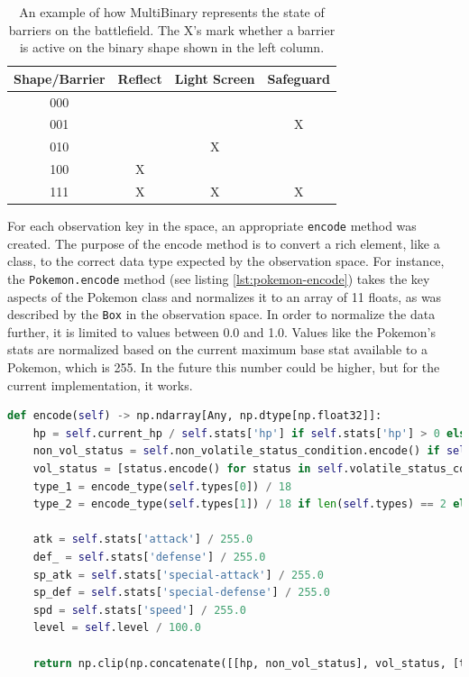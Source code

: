 \begin{table}[h]
    \centering
    \begin{tabular}{|c|c|c|c|}
        \hline
        Shape/Barrier & Reflect & Light Screen & Safeguard \\\hline
        000           &         &              &           \\\hline
        001           &         &              & X         \\\hline
        010           &         & X            &           \\\hline
        100           & X       &              &           \\\hline
        111           & X       & X            & X         \\\hline
    \end{tabular}
    \label{tab:multibinary-barrier-example}
    \caption{An example of how MultiBinary represents the state of barriers on the battlefield. The X's mark whether a
        barrier is active on the binary shape shown in the left column.}
\end{table}

For each observation key in the space, an appropriate \lstinline|encode| method was created. The purpose of the encode method
is to convert a rich element, like a class, to the correct data type expected by the observation space. For instance, the
\lstinline|Pokemon.encode| method (see listing \ref{lst:pokemon-encode}) takes the key aspects of the Pokemon class and normalizes it to an array of 11 floats,
as was described by the \lstinline|Box| in the observation space. In order to normalize the data further, it is limited to
values between 0.0 and 1.0. Values like the Pokemon's stats are normalized based on the current maximum base stat available to 
a Pokemon, which is 255. In the future this number could be higher, but for the current implementation, it works.  

\begin{lstlisting}[basicstyle=\fontsize{10}{10}\selectfont\ttfamily,language=Python,caption={The Pokemon encode method.},label=lst:pokemon-encode,breaklines]
def encode(self) -> np.ndarray[Any, np.dtype[np.float32]]:
    hp = self.current_hp / self.stats['hp'] if self.stats['hp'] > 0 else 0.0
    non_vol_status = self.non_volatile_status_condition.encode() if self.non_volatile_status_condition else 0.0
    vol_status = [status.encode() for status in self.volatile_status_conditions] if len(self.volatile_status_conditions) > 0 else [0.0]
    type_1 = encode_type(self.types[0]) / 18
    type_2 = encode_type(self.types[1]) / 18 if len(self.types) == 2 else 0.0

    atk = self.stats['attack'] / 255.0
    def_ = self.stats['defense'] / 255.0
    sp_atk = self.stats['special-attack'] / 255.0
    sp_def = self.stats['special-defense'] / 255.0
    spd = self.stats['speed'] / 255.0
    level = self.level / 100.0

    return np.clip(np.concatenate([[hp, non_vol_status], vol_status, [type_1, type_2, atk, def_, sp_atk, sp_def, spd, level]]).astype(np.float32), 0.0, 1.0)
\end{lstlisting}

